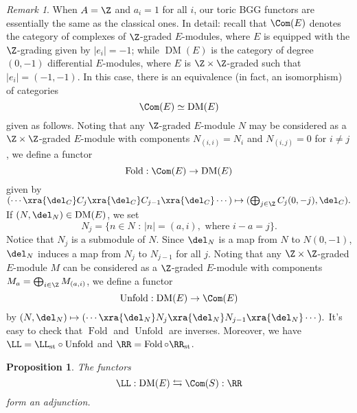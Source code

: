 \documentclass[12pt]{amsart}
\newtheorem{prop}[lemma]{Proposition}
\theoremstyle{definition}
\theoremstyle{remark}
\newtheorem{remark}[lemma]{Remark}
\def\on{\operatorname}
\def\DM{\operatorname{DM}}
\begin{document}
\begin{remark}\label{rmk:PPn DM is complexes}
When $A = \Z$ and $a_i = 1$ for all $i$, our toric BGG functors are essentially the same as the classical ones. In detail: recall that $\Com(E)$ denotes the category of complexes of $\Z$-graded $E$-modules, where $E$ is equipped with the $\Z$-grading given by $|e_i| = -1$; while $\DM(E)$ is the category of degree $(0, -1)$ differential $E$-modules, where $E$ is $\Z \times \Z$-graded such that $|e_i| = (-1, -1)$. In this case, there is an equivalence (in fact, an isomorphism) of categories
$$
\Com(E) \simeq \DM(E)
$$
given as follows. Noting that any $\Z$-graded $E$-module $N$ may be considered as a $\Z \times \Z$-graded $E$-module with components $N_{(i, i)} = N_i$ and $N_{(i, j)} = 0$ for $i \ne j$, we define a functor
$$
\on{Fold} : \Com(E) \to \DM(E)
$$
given by $(\cdots \xra{\del_C} C_j \xra{\del_C} C_{j-1} \xra{\del_C} \cdots) \mapsto (\bigoplus_{j \in \Z} C_j(0, -j), \del_C).$ If $(N, \del_N) \in \DM(E)$, we set
$$
N_j = \{n \in N \text{ : } |n| = (a, i), \text{ where } i - a = j\}.
$$
Notice that $N_j$ is a submodule of $N$. Since $\del_N$ is a map from $N$ to $N(0, -1)$, $\del_N$ induces a map from $N_j$ to $N_{j -1}$ for all $j$. Noting that any $\Z \times \Z$-graded $E$-module $M$ can be considered as a $\Z$-graded $E$-module with components $M_a = \bigoplus_{i  \in \Z} M_{(a, i)}$, we define a functor
$$
\on{Unfold} : \DM(E) \to \Com(E)
$$
by $(N, \del_N) \mapsto (\cdots \xra{\del_N} N_j \xra{\del_N} N_{j-1} \xra{\del_N} \cdots ).$ It's easy to check that $\on{Fold}$ and $\on{Unfold}$ are inverses. Moreover, we have $\LL = \LL_{\on{st}} \circ \on{Unfold}$ and $\RR = \on{Fold} \circ \RR_{\on{st}}$.
\end{remark}



\begin{prop}
The functors
$$
\LL :  \DM(E) \leftrightarrows \Com(S) : \RR
$$
form an adjunction.
\end{prop}
\end{document}
